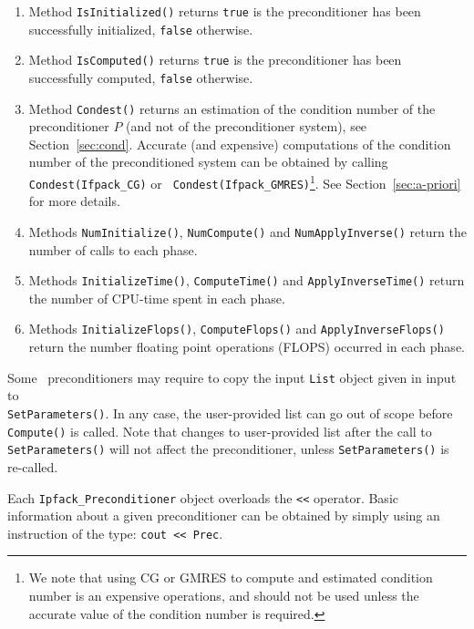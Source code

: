 {\begin{enumerate}
\item Method \verb!IsInitialized()! returns {\tt true} is the preconditioner has
been successfully initialized, {\tt false} otherwise.
%
\item Method \verb!IsComputed()! returns {\tt true} is the preconditioner has
been successfully computed, {\tt false} otherwise.
%
\item Method \verb!Condest()! returns an estimation of the condition
number of the preconditioner $P$ (and not of the preconditioner system), see
Section~\ref{sec:cond}. 
Accurate (and expensive) computations of the condition number of
the preconditioned system can be
obtained by calling {\tt Condest(Ifpack\_CG)} or {\tt
  Condest(Ifpack\_GMRES)}\footnote{We note that using CG or GMRES to compute
and estimated condition number is an expensive operations, and should not
be used unless the accurate value of the condition number is required.}.
See Section~\ref{sec:a-priori} for more details.
%
\item Methods \verb!NumInitialize()!, \verb!NumCompute()! and
\verb!NumApplyInverse()! return the number of calls to each phase.
%
\item Methods \verb!InitializeTime()!, \verb!ComputeTime()! and
\verb!ApplyInverseTime()! return the number of CPU-time spent in each phase.
%
\item Methods \verb!InitializeFlops()!, \verb!ComputeFlops()! and
\verb!ApplyInverseFlops()! return the number floating point operations (FLOPS)
  occurred in each phase.
\end{enumerate}


\begin{remark}
Some \ifpack\ preconditioners may require to copy the input \verb!List! object
given in input to \\ \verb!SetParameters()!. In any case, the
user-provided list can go out of scope before \verb!Compute()! is called.
Note that changes to user-provided list after the call to
\verb!SetParameters()! will not affect the preconditioner,
  unless \verb!SetParameters()!  is re-called.
\end{remark}

\begin{remark}
Each \verb!Ipfack_Preconditioner! object overloads the \verb!<<! operator.
Basic information about a given preconditioner can be obtained by simply
using an instruction of the type: \verb!cout << Prec!.
\end{remark}

}
